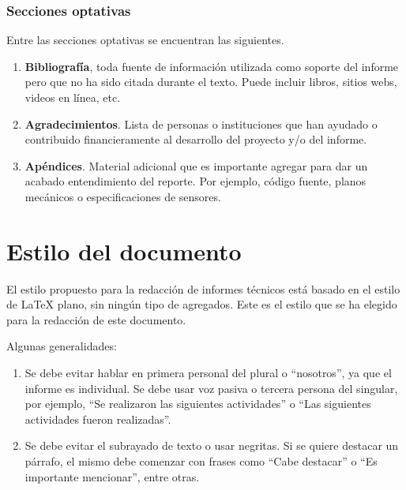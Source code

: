 \documentclass{article}
\begin{document}
\subsubsection{Secciones optativas}

Entre las secciones optativas se encuentran las siguientes.

\begin{enumerate}

    \item \textbf{Bibliografía}, toda fuente de información utilizada como soporte del informe pero que no ha sido citada durante el texto. Puede incluir libros, sitios webs, videos en línea, etc.

    \item \textbf{Agradecimientos}. Lista de personas o instituciones que han ayudado o contribuido financieramente al desarrollo del proyecto y/o del informe.

    \item \textbf{Apéndices}. Material adicional que es importante agregar para dar un acabado entendimiento del reporte. Por ejemplo, código fuente, planos mecánicos o especificaciones de sensores.

\end{enumerate}

\section{Estilo del documento}
\label{sec:estilo}

El estilo propuesto para la redacción de informes técnicos está basado en el estilo de \LaTeX{} plano, sin ningún tipo de agregados. Este es el estilo que se ha elegido para la redacción de este documento.

Algunas generalidades:

\begin{enumerate}

    \item Se debe evitar hablar en primera personal del plural o ``nosotros'', ya que el informe es individual. Se debe usar voz pasiva o tercera persona del singular, por ejemplo, ``Se realizaron las siguientes actividades'' o ``Las siguientes actividades fueron realizadas''.

    \item Se debe evitar el subrayado de texto o usar negritas. Si se quiere destacar un párrafo, el mismo debe comenzar con frases como ``Cabe destacar'' o ``Es importante mencionar'', entre otras.

\end{enumerate}
\end{document}
